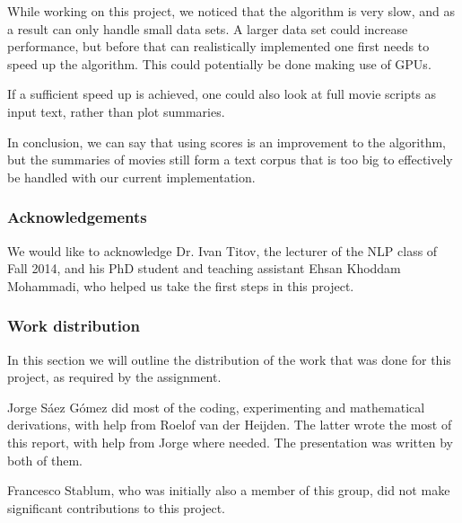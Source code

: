 \documentclass{article} %
\begin{document}
While working on this project, we noticed that the algorithm is very slow, and as a result can only handle small data sets.
A larger data set could increase performance, but before that can realistically implemented one first needs to speed up the algorithm. This could potentially be done making use of GPUs.

If a sufficient speed up is achieved, one could also look at full movie scripts as input text, rather than plot summaries. 

In conclusion, we can say that using scores is an improvement to the algorithm, but the summaries of movies still form a text corpus that is too big to effectively be handled with our current implementation.

\subsubsection*{Acknowledgements}

We would like to acknowledge Dr. Ivan Titov, the lecturer of the NLP class of Fall 2014, and his PhD student and teaching assistant Ehsan Khoddam Mohammadi, who helped us take the first steps in this project.

\subsubsection*{Work distribution}
In this section we will outline the distribution of the work that was done for this project, as required by the assignment.

Jorge S\'{a}ez G\'{o}mez did most of the coding, experimenting and mathematical derivations, with help from Roelof van der Heijden.
The latter wrote the most of this report, with help from Jorge where needed.
The presentation was written by both of them.

Francesco Stablum, who was initially also a member of this group, did not make significant contributions to this project.
\end{document}

